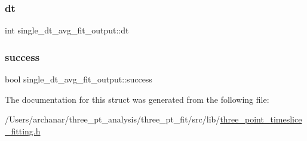 \subsubsection{\texorpdfstring{dt}{dt}}
{\footnotesize\ttfamily int single\+\_\+dt\+\_\+avg\+\_\+fit\+\_\+output\+::dt}

\mbox{\label{structsingle__dt__avg__fit__output_a63196f562c667944bbfac71206801a31}} 
\subsubsection{\texorpdfstring{success}{success}}
{\footnotesize\ttfamily bool single\+\_\+dt\+\_\+avg\+\_\+fit\+\_\+output\+::success}



The documentation for this struct was generated from the following file\+:\begin{DoxyCompactItemize}
\item 
/\+Users/archanar/three\+\_\+pt\+\_\+analysis/three\+\_\+pt\+\_\+fit/src/lib/\mbox{\hyperlink{src_2lib_2three__point__timeslice__fitting_8h}{three\+\_\+point\+\_\+timeslice\+\_\+fitting.\+h}}\end{DoxyCompactItemize}

